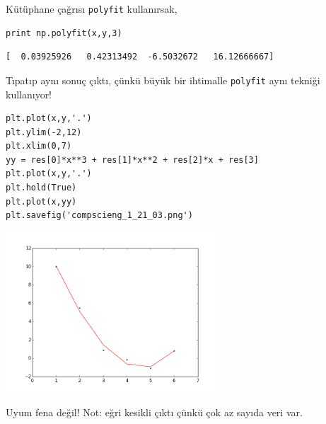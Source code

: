 \documentclass[12pt,fleqn]{article}\usepackage{../../common}
\begin{document}
Kütüphane çağrısı \verb!polyfit! kullanırsak,

\begin{verbatim}
print np.polyfit(x,y,3)
\end{verbatim}

\begin{verbatim}
[  0.03925926   0.42313492  -6.5032672   16.12666667]
\end{verbatim}

Tıpatıp aynı sonuç çıktı, çünkü büyük bir ihtimalle \verb!polyfit! aynı
tekniği kullanıyor! 

\begin{verbatim}
plt.plot(x,y,'.')
plt.ylim(-2,12)
plt.xlim(0,7)
yy = res[0]*x**3 + res[1]*x**2 + res[2]*x + res[3]
plt.plot(x,y,'.')
plt.hold(True)
plt.plot(x,yy)
plt.savefig('compscieng_1_21_03.png')
\end{verbatim}

\includegraphics[height=6cm]{compscieng_1_21_03.png}

Uyum fena değil! Not: eğri kesikli çıktı çünkü çok az sayıda veri var. 
\end{document}
